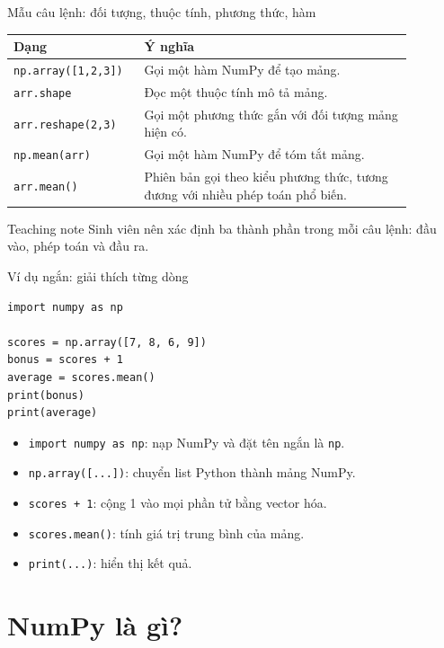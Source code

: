 \documentclass[aspectratio=169,11pt]{beamer}
\begin{document}
\begin{frame}{Mẫu câu lệnh: đối tượng, thuộc tính, phương thức, hàm}
\small
\begin{tabular}{p{0.26\linewidth}p{0.62\linewidth}}
\toprule
\textbf{Dạng} & \textbf{Ý nghĩa} \\
\midrule
\texttt{np.array([1,2,3])} & Gọi một hàm NumPy để tạo mảng. \\
\texttt{arr.shape} & Đọc một thuộc tính mô tả mảng. \\
\texttt{arr.reshape(2,3)} & Gọi một phương thức gắn với đối tượng mảng hiện có. \\
\texttt{np.mean(arr)} & Gọi một hàm NumPy để tóm tắt mảng. \\
\texttt{arr.mean()} & Phiên bản gọi theo kiểu phương thức, tương đương với nhiều phép toán phổ biến. \\
\bottomrule
\end{tabular}
\vspace{0.5em}
\begin{alertblock}{Teaching note}
Sinh viên nên xác định ba thành phần trong mỗi câu lệnh: đầu vào, phép toán và đầu ra.
\end{alertblock}
\end{frame}

\begin{frame}[fragile]{Ví dụ ngắn: giải thích từng dòng}
\small
\begin{lstlisting}[style=py]
import numpy as np

scores = np.array([7, 8, 6, 9])
bonus = scores + 1
average = scores.mean()
print(bonus)
print(average)
\end{lstlisting}
\begin{itemize}
  \item \texttt{import numpy as np}: nạp NumPy và đặt tên ngắn là \texttt{np}.
  \item \texttt{np.array([...])}: chuyển list Python thành mảng NumPy.
  \item \texttt{scores + 1}: cộng 1 vào mọi phần tử bằng vector hóa.
  \item \texttt{scores.mean()}: tính giá trị trung bình của mảng.
  \item \texttt{print(...)}: hiển thị kết quả.
\end{itemize}
\end{frame}

\section{NumPy là gì?}
\end{document}
